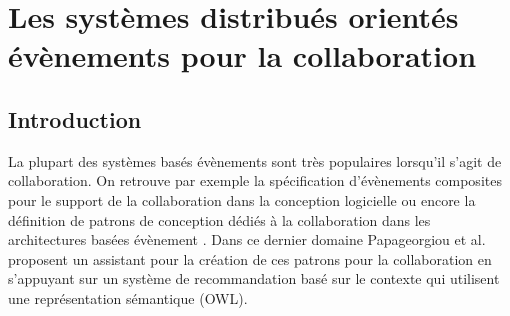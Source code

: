 %
%



\section{Les systèmes distribués orientés évènements pour la collaboration}

	\subsection{Introduction}
La plupart des systèmes basés évènements sont très populaires lorsqu'il s'agit de 
collaboration. On retrouve par exemple la spécification d'évènements composites 
pour le support de la collaboration dans la conception logicielle \cite{Yuan2002} 
ou encore la définition de patrons de conception dédiés à la collaboration dans les 
architectures basées évènement \cite{Verginadis2009}. Dans ce dernier domaine 
Papageorgiou et al. \cite{Papageorgiou2011} proposent un assistant pour la 
création de ces patrons pour la collaboration en s'appuyant sur un système de 
recommandation basé sur le contexte qui utilisent une représentation sémantique 
(\gls{OWL}).

